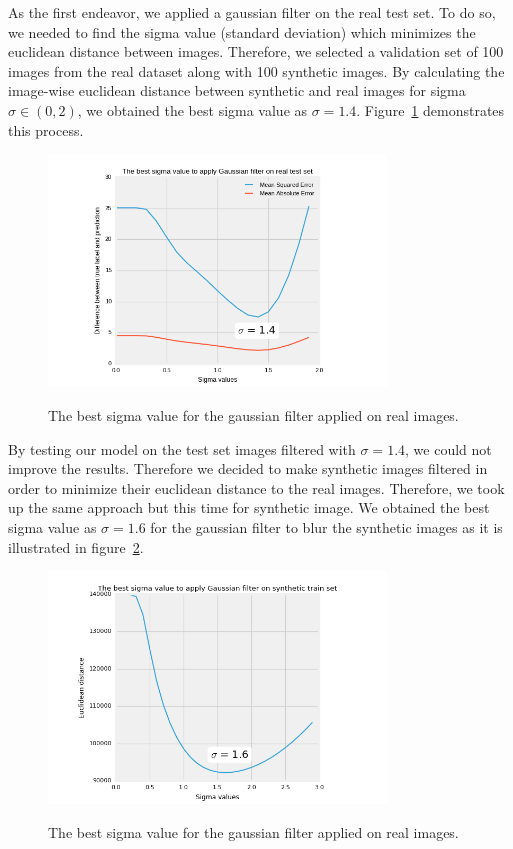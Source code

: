 As the first endeavor, we applied a gaussian filter on the real test set. To do so, we needed to find the sigma value (standard deviation) which minimizes the euclidean distance between images. Therefore, we selected a validation set of 100 images from the real dataset along with 100 synthetic images. By calculating the image-wise euclidean distance between synthetic and real images for sigma $ \sigma \in (0, 2) $, we obtained the best sigma value as $ \sigma = 1.4 $. Figure~\ref{sigsig} demonstrates this process. 
\begin{figure}[H]
	\centering
	{\includegraphics[width=0.8\textwidth]{images/sigmaTest}}
	\caption{The best sigma value for the gaussian filter applied on real images.}
	\label{sigsig}
\end{figure}
By testing our model on the test set images filtered with $ \sigma=1.4 $, we could not improve the results. Therefore we decided to make synthetic images filtered in order to minimize their euclidean distance to the real images. Therefore, we took up the same approach but this time for synthetic image. We obtained the best sigma value as $ \sigma=1.6 $ for the gaussian filter to blur the synthetic images as it is illustrated in figure~\ref{sig2}.   
\begin{figure}[H]
	\centering
	{\includegraphics[width=0.8\textwidth]{images/sigmaTrain}}
	\caption{The best sigma value for the gaussian filter applied on real images.}
	\label{sig2}
\end{figure}
